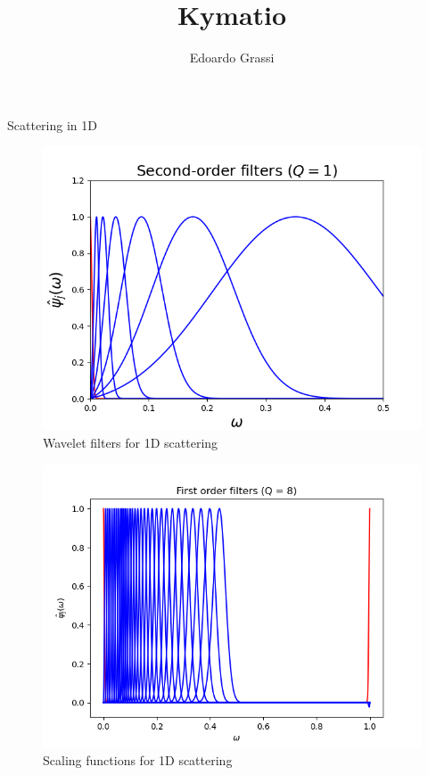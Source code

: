 \documentclass{article}
\begin{document}
\graphicspath{{data/images/}}


\title{Kymatio}
\author{Edoardo Grassi}

\begin{section}{Scattering in 1D}
    \begin{figure}
        \includegraphics{wavelet-filters-1d}
        \caption{Wavelet filters for 1D scattering}
    \end{figure}

    \begin{figure}
        \includegraphics{scaling-filters-1d}
        \caption{Scaling functions for 1D scattering}
    \end{figure}


\end{section}
\end{document}
